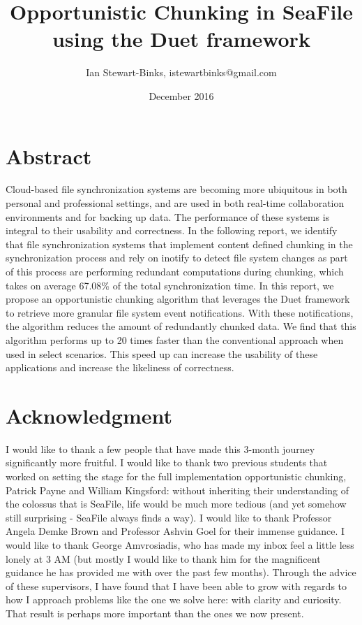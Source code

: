 \documentclass[table]{article}
\title{Opportunistic Chunking in SeaFile using the Duet framework}
\author{Ian Stewart-Binks, istewartbinks@gmail.com}
\date{December 2016}
\begin{document}
\maketitle

\newpage

\begin{multicols}{2}

\section{Abstract}


Cloud-based file synchronization systems are becoming more ubiquitous in both personal and professional settings, and are used in both real-time collaboration environments and for backing up data. The performance of these systems is integral to their usability and correctness. In the following report, we identify that file synchronization systems that implement content defined chunking in the synchronization process and rely on inotify to detect file system changes as part of this process are performing redundant computations during chunking, which takes on average 67.08\% of the total synchronization time. In this report, we propose an opportunistic chunking algorithm that leverages the Duet framework to retrieve more granular file system event notifications. With these notifications, the algorithm reduces the amount of redundantly chunked data. We find that this algorithm performs up to 20 times faster than the conventional approach when used in select scenarios. This speed up can increase the usability of these applications and increase the likeliness of correctness.

\section{Acknowledgment}

I would like to thank a few people that have made this 3-month journey significantly more fruitful. I would like to thank two previous students that worked on setting the stage for the full implementation opportunistic chunking, Patrick Payne and William Kingsford: without inheriting their understanding of the colossus that is SeaFile, life would be much more tedious (and yet somehow still surprising - SeaFile always finds a way). I would like to thank Professor Angela Demke Brown and Professor Ashvin Goel for their immense guidance. I would like to thank George Amvrosiadis, who has made my inbox feel a little less lonely at 3 AM (but mostly I would like to thank him for the magnificent guidance he has provided me with over the past few months). Through the advice of these supervisors, I have found that I have been able to grow with regards to how I approach problems like the one we solve here: with clarity and curiosity. That result is perhaps more important than the ones we now present.


\end{multicols}
\end{document}
